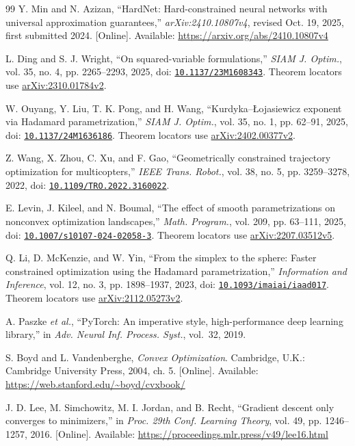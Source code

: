 \documentclass[10pt,a4paper]{article}
\begin{document}
\begin{thebibliography}{99}
 Y. Min and N. Azizan, ``HardNet: Hard-constrained neural networks with universal approximation guarantees,'' \emph{arXiv:2410.10807v4}, revised Oct. 19, 2025, first submitted 2024. [Online]. Available: \url{https://arxiv.org/abs/2410.10807v4}

 L. Ding and S. J. Wright, ``On squared-variable formulations,'' \emph{SIAM J. Optim.}, vol. 35, no. 4, pp. 2265--2293, 2025, doi: \href{https://doi.org/10.1137/23M1608343}{\nolinkurl{10.1137/23M1608343}}. Theorem locators use \href{https://arxiv.org/abs/2310.01784v2}{arXiv:2310.01784v2}.

 W. Ouyang, Y. Liu, T. K. Pong, and H. Wang, ``Kurdyka--\L{}ojasiewicz exponent via Hadamard parametrization,'' \emph{SIAM J. Optim.}, vol. 35, no. 1, pp. 62--91, 2025, doi: \href{https://doi.org/10.1137/24M1636186}{\nolinkurl{10.1137/24M1636186}}. Theorem locators use \href{https://arxiv.org/abs/2402.00377v2}{arXiv:2402.00377v2}.

 Z. Wang, X. Zhou, C. Xu, and F. Gao, ``Geometrically constrained trajectory optimization for multicopters,'' \emph{IEEE Trans. Robot.}, vol. 38, no. 5, pp. 3259--3278, 2022, doi: \href{https://doi.org/10.1109/TRO.2022.3160022}{\nolinkurl{10.1109/TRO.2022.3160022}}.

 E. Levin, J. Kileel, and N. Boumal, ``The effect of smooth parametrizations on nonconvex optimization landscapes,'' \emph{Math. Program.}, vol. 209, pp. 63--111, 2025, doi: \href{https://doi.org/10.1007/s10107-024-02058-3}{\nolinkurl{10.1007/s10107-024-02058-3}}. Theorem locators use \href{https://arxiv.org/abs/2207.03512v5}{arXiv:2207.03512v5}.

 Q. Li, D. McKenzie, and W. Yin, ``From the simplex to the sphere: Faster constrained optimization using the Hadamard parametrization,'' \emph{Information and Inference}, vol. 12, no. 3, pp. 1898--1937, 2023, doi: \href{https://doi.org/10.1093/imaiai/iaad017}{\nolinkurl{10.1093/imaiai/iaad017}}. Theorem locators use \href{https://arxiv.org/abs/2112.05273v2}{arXiv:2112.05273v2}.

 A. Paszke \emph{et al.}, ``PyTorch: An imperative style, high-performance deep learning library,'' in \emph{Adv. Neural Inf. Process. Syst.}, vol.~32, 2019.

 S. Boyd and L. Vandenberghe, \emph{Convex Optimization}. Cambridge, U.K.: Cambridge University Press, 2004, ch. 5. [Online]. Available: \url{https://web.stanford.edu/~boyd/cvxbook/}

 J. D. Lee, M. Simchowitz, M. I. Jordan, and B. Recht, ``Gradient descent only converges to minimizers,'' in \emph{Proc. 29th Conf. Learning Theory}, vol. 49, pp. 1246--1257, 2016. [Online]. Available: \url{https://proceedings.mlr.press/v49/lee16.html}
\end{thebibliography}
\end{document}
